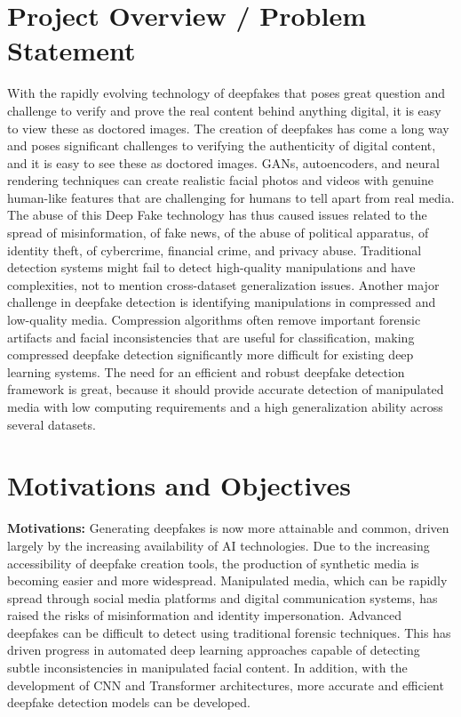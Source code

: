 \documentclass[12pt,a4paper]{report}
\begin{document}
\section{Project Overview / Problem Statement}
With the rapidly evolving technology of deepfakes that poses great question and challenge to verify and prove the real content behind anything digital, it is easy to view these as doctored images. The creation of deepfakes has come a long way and poses significant challenges to verifying the authenticity of digital content, and it is easy to see these as doctored images. GANs, autoencoders, and neural rendering techniques can create realistic facial photos and videos with genuine human-like features that are challenging for humans to tell apart from real media. The abuse of this Deep Fake technology has thus caused issues related to the spread of misinformation, of fake news, of the abuse of political apparatus, of identity theft, of cybercrime, financial crime, and privacy abuse. Traditional detection systems might fail to detect high-quality manipulations and have complexities, not to mention cross-dataset generalization issues. Another major challenge in deepfake detection is identifying manipulations in compressed and low-quality media. Compression algorithms often remove important forensic artifacts and facial inconsistencies that are useful for classification, making compressed deepfake detection significantly more difficult for existing deep learning systems. The need for an efficient and robust deepfake detection framework is great, because it should provide accurate detection of manipulated media with low computing requirements and a high generalization ability across several datasets.
\section{Motivations and Objectives}
\textbf{Motivations:} Generating deepfakes is now more attainable and common, driven largely by the increasing availability of AI technologies. Due to the increasing accessibility of deepfake creation tools, the production of synthetic media is becoming easier and more widespread. Manipulated media, which can be rapidly spread through social media platforms and digital communication systems, has raised the risks of misinformation and identity impersonation. Advanced deepfakes can be difficult to detect using traditional forensic techniques. This has driven progress in automated deep learning approaches capable of detecting subtle inconsistencies in manipulated facial content. In addition, with the development of CNN and Transformer architectures, more accurate and efficient deepfake detection models can be developed.
\end{document}
